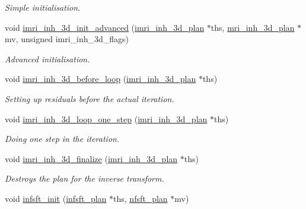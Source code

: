 \begin{CompactItemize}
\begin{CompactList}\small\item\em Simple initialisation. \item\end{CompactList}\item 
\hypertarget{group__solver_ga26}{
void \hyperlink{group__solver_ga26}{imri\_\-inh\_\-3d\_\-init\_\-advanced} (\hyperlink{structimri__inh__3d__plan}{imri\_\-inh\_\-3d\_\-plan} $\ast$ths, \hyperlink{structmri__inh__3d__plan}{mri\_\-inh\_\-3d\_\-plan} $\ast$mv, unsigned imri\_\-inh\_\-3d\_\-flags)}
\label{group__solver_ga26}

\begin{CompactList}\small\item\em Advanced initialisation. \item\end{CompactList}\item 
\hypertarget{group__solver_ga27}{
void \hyperlink{group__solver_ga27}{imri\_\-inh\_\-3d\_\-before\_\-loop} (\hyperlink{structimri__inh__3d__plan}{imri\_\-inh\_\-3d\_\-plan} $\ast$ths)}
\label{group__solver_ga27}

\begin{CompactList}\small\item\em Setting up residuals before the actual iteration. \item\end{CompactList}\item 
\hypertarget{group__solver_ga28}{
void \hyperlink{group__solver_ga28}{imri\_\-inh\_\-3d\_\-loop\_\-one\_\-step} (\hyperlink{structimri__inh__3d__plan}{imri\_\-inh\_\-3d\_\-plan} $\ast$ths)}
\label{group__solver_ga28}

\begin{CompactList}\small\item\em Doing one step in the iteration. \item\end{CompactList}\item 
\hypertarget{group__solver_ga29}{
void \hyperlink{group__solver_ga29}{imri\_\-inh\_\-3d\_\-finalize} (\hyperlink{structimri__inh__3d__plan}{imri\_\-inh\_\-3d\_\-plan} $\ast$ths)}
\label{group__solver_ga29}

\begin{CompactList}\small\item\em Destroys the plan for the inverse transform. \item\end{CompactList}\item 
\hypertarget{group__solver_ga30}{
void \hyperlink{group__solver_ga30}{infsft\_\-init} (\hyperlink{structinfsft__plan}{infsft\_\-plan} $\ast$ths, \hyperlink{structnfsft__plan}{nfsft\_\-plan} $\ast$mv)}
\label{group__solver_ga30}


\end{CompactItemize}
